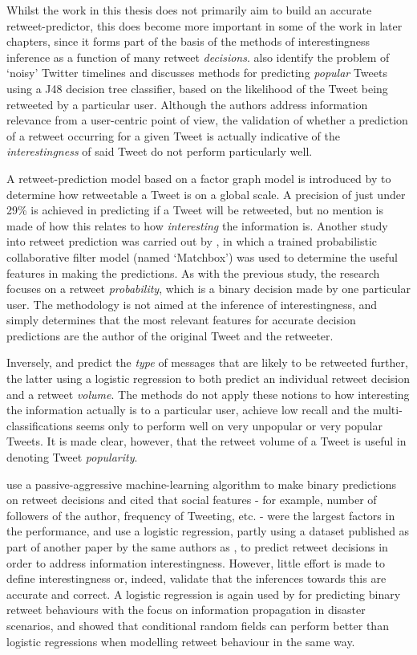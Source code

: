 Whilst the work in this thesis does not primarily aim to build an accurate retweet-predictor, this does become more important in some of the work in later chapters, since it forms part of the basis of the methods of interestingness inference as a function of many retweet \textit{decisions}. \citet{uysal11} also identify the problem of `noisy' Twitter timelines and discusses methods for predicting \textit{popular} Tweets using a J48 decision tree classifier, based on the likelihood of the Tweet being retweeted by a particular user. Although the authors address information relevance from a user-centric point of view, the validation of whether a prediction of a retweet occurring for a given Tweet is actually indicative of the \textit{interestingness} of said Tweet do not perform particularly well.

A retweet-prediction model based on a factor graph model is introduced by \citet{yang10} to determine how retweetable a Tweet is on a global scale. A precision of just under 29\% is achieved in predicting if a Tweet will be retweeted, but no mention is made of how this relates to how \textit{interesting} the information is. Another study into retweet prediction was carried out by \citet{zaman10}, in which a trained probabilistic collaborative filter model (named `Matchbox') was used to determine the useful features in making the predictions. As with the previous study, the research focuses on a retweet \textit{probability}, which is a binary decision made by one particular user. The methodology is not aimed at the inference of interestingness, and simply determines that the most relevant features for accurate decision predictions are the author of the original Tweet and the retweeter.

Inversely, \citet{suh10} and \citet{hong11} predict the \textit{type} of messages that are likely to be retweeted further, the latter using a logistic regression to both predict an individual retweet decision and a retweet \textit{volume}. The methods do not apply these notions to how interesting the information actually is to a particular user, achieve low recall and the multi-classifications seems only to perform well on very unpopular or very popular Tweets. It is made clear, however, that the retweet volume of a Tweet is useful in denoting Tweet \textit{popularity}.

\citet{petrovic11} use a passive-aggressive machine-learning algorithm to make binary predictions on retweet decisions and cited that social features - for example, number of followers of the author, frequency of Tweeting, etc. - were the largest factors in the performance, and \citet{naveed11} use a logistic regression, partly using a dataset published as part of another paper by the same authors as \citet{petrovic11}, to predict retweet decisions in order to address information interestingness. However, little effort is made to define interestingness or, indeed, validate that the inferences towards this are accurate and correct. A logistic regression is again used by \citet{zhu11} for predicting binary retweet behaviours with the focus on information propagation in disaster scenarios, and \citet{peng11} showed that conditional random fields can perform better than logistic regressions when modelling retweet behaviour in the same way.

